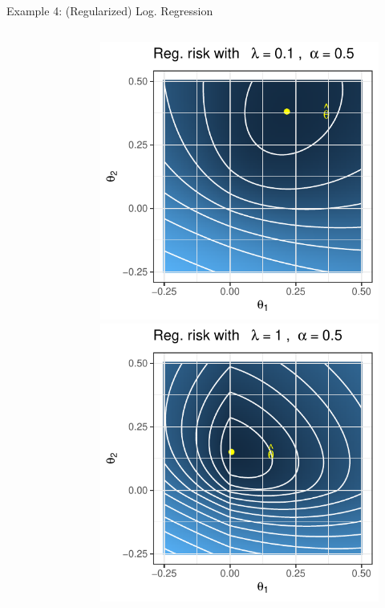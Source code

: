 \documentclass[11pt,compress,t,notes=noshow, xcolor=table]{beamer}
\begin{document}
\begin{vbframe}{Example 4: (Regularized) Log. Regression}
\begin{columns}
\begin{column}{.28\textwidth}
\begin{figure}
\end{figure}
\end{column}
\begin{column}{.28\textwidth}
\begin{figure}
	\includegraphics{figure_man/logreg-0.5-0.1.pdf}\\
	\includegraphics{figure_man/logreg-0.5-1.pdf} 

\end{figure}
\end{column}
\end{columns}
\end{vbframe}
\end{document}
